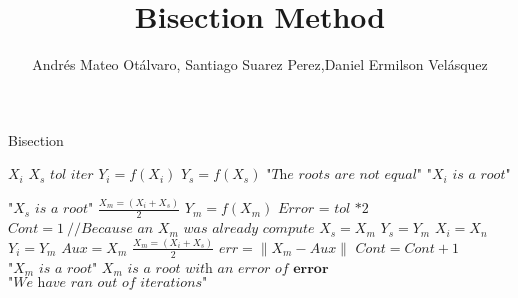 \documentclass{article}
\title{Bisection Method}
\author{Andrés Mateo Otálvaro, Santiago Suarez Perez,Daniel Ermilson Velásquez}
\begin{document}
\maketitle
\begin{algorithm}
\caption{Bisection}\label{numerical methods}
\begin{algorithmic}[1]
\State $\textit{$X_i$}$\;
\State $\textit{$X_s$}$\;
\State $\textit{tol}$\;
\State $\textit{iter}$\;
\State $Y_i=f(X_i)$\;
\State$Y_s=f(X_s)$\;
		\State $\textit{"The roots are not equal"}$
		\State $\textit{"$X_i$ is a root"}$
	
		\State $\textit{"$X_s$ is a root"}$ 
	\Else
		\State $\frac{X_m=(X_i+X_s)}{2}$
		\State $Y_m=f(X_m)$
		\State $\textit{Error\ = tol *2}$ 
		\State $Cont=1\ \textit{//Because an $X_m$ was already compute}$
				\State $X_s=X_m$
				\State $Y_s=Y_m$
			\Else 
				\State $X_i=X_n$
				\State $Y_i=Y_m$
			\EndIf
				\State $Aux=X_m$
				\State $\frac{X_m=(X_i+X_s)}{2}$
				\State $err= \|X_m-Aux \| $
				\State $Cont=Cont+1$
		\EndWhile
			\State $\textit{"$X_m$ is a root"}$
			\State $\textit{$X_m$ is a root with an error of\ } \textbf{error}$ 
			\State $\textit{"We have ran out of iterations"}$
		\EndIf
	\EndIf
\EndProcedure
\end{algorithmic}
\end{algorithm}
\end{document}
